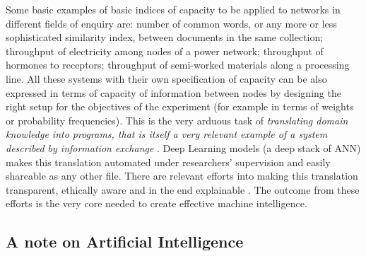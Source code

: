 \documentclass[14pt]{extarticle}
\begin{document}
Some basic examples of basic indices of capacity to be applied to networks in different fields of enquiry are: number of common words, or any more or less sophisticated similarity index, between documents in the same collection; throughput of electricity among nodes of a power network; throughput of hormones to receptors; throughput of semi-worked materials along a processing line. All these systems with their own specification of capacity can be also expressed in terms of capacity of information between nodes by designing the right setup for the objectives of the experiment (for example in terms of weights or probability frequencies). This is the very arduous task of \textit{translating domain knowledge into programs, that is itself a very relevant example of a system described by information exchange} \cite{nguyen2008global}. Deep Learning models (a deep stack of ANN) makes this translation automated under researchers' supervision and easily shareable as any other file. There are relevant efforts into making this translation transparent, ethically aware and in the end explainable \cite{enwiki:1083004803}. The outcome from these efforts is the very core needed to create effective machine intelligence.


\subsection*{A note on Artificial Intelligence}
\label{sec:ai}
\end{document}
